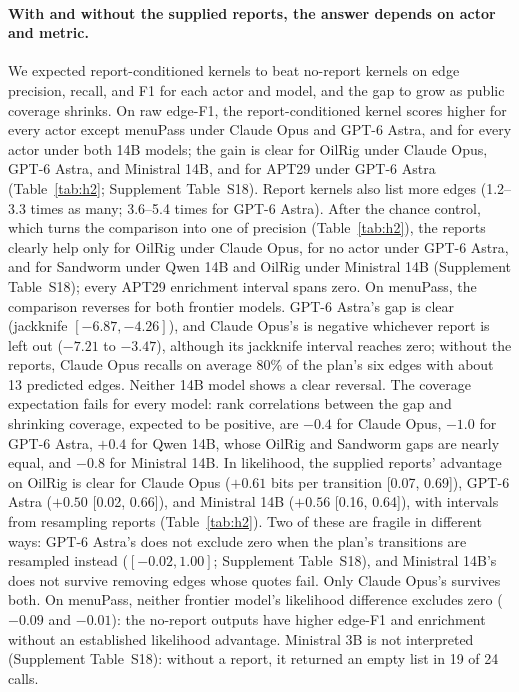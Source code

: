 \documentclass[letterpaper]{article}
\begin{document}
\paragraph{With and without the supplied reports, the answer depends on actor and metric.} We expected report-conditioned kernels to beat no-report kernels on edge precision, recall, and F1 for each actor and model, and the gap to grow as public coverage shrinks. On raw edge-F1, the report-conditioned kernel scores higher for every actor except menuPass under Claude Opus and GPT-6 Astra, and for every actor under both 14B models; the gain is clear for OilRig under Claude Opus, GPT-6 Astra, and Ministral 14B, and for APT29 under GPT-6 Astra (Table~\ref{tab:h2}; Supplement Table~S18). Report kernels also list more edges (1.2--3.3 times as many; 3.6--5.4 times for GPT-6 Astra). After the chance control, which turns the comparison into one of precision (Table~\ref{tab:h2}), the reports clearly help only for OilRig under Claude Opus, for no actor under GPT-6 Astra, and for Sandworm under Qwen 14B and OilRig under Ministral 14B (Supplement Table~S18); every APT29 enrichment interval spans zero. On menuPass, the comparison reverses for both frontier models. GPT-6 Astra's gap is clear (jackknife $[-6.87, -4.26]$), and Claude Opus's is negative whichever report is left out ($-7.21$ to $-3.47$), although its jackknife interval reaches zero; without the reports, Claude Opus recalls on average 80\% of the plan's six edges with about 13 predicted edges. Neither 14B model shows a clear reversal. The coverage expectation fails for every model: rank correlations between the gap and shrinking coverage, expected to be positive, are $-0.4$ for Claude Opus, $-1.0$ for GPT-6 Astra, $+0.4$ for Qwen 14B, whose OilRig and Sandworm gaps are nearly equal, and $-0.8$ for Ministral 14B. In likelihood, the supplied reports' advantage on OilRig is clear for Claude Opus ($+0.61$ bits per transition [0.07, 0.69]), GPT-6 Astra ($+0.50$ [0.02, 0.66]), and Ministral 14B ($+0.56$ [0.16, 0.64]), with intervals from resampling reports (Table~\ref{tab:h2}). Two of these are fragile in different ways: GPT-6 Astra's does not exclude zero when the plan's transitions are resampled instead ($[-0.02, 1.00]$; Supplement Table~S18), and Ministral 14B's does not survive removing edges whose quotes fail. Only Claude Opus's survives both. On menuPass, neither frontier model's likelihood difference excludes zero ($-0.09$ and $-0.01$): the no-report outputs have higher edge-F1 and enrichment without an established likelihood advantage. Ministral 3B is not interpreted (Supplement Table~S18): without a report, it returned an empty list in 19 of 24 calls.
\end{document}
